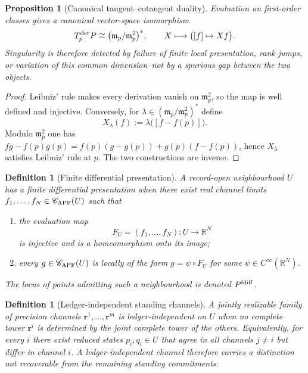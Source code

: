 \documentclass[11pt]{article}
\newtheorem{proposition}[theorem]{Proposition}
\newtheorem{definition}[theorem]{Definition}
\theoremstyle{remark}
\begin{document}
\begin{proposition}[Canonical tangent--cotangent duality]
\label{prop:derivation-cotangent-pairing}
Evaluation on first-order classes gives a canonical vector-space isomorphism
\[
 T_p^{\rm der}P
 \cong
 \bigl(\mathfrak m_p/\mathfrak m_p^2\bigr)^*,
 \qquad
 X\longmapsto\bigl([f]\mapsto Xf\bigr).
\]
Singularity is therefore detected by failure of finite local presentation,
rank jumps, or variation of this common dimension--not by a spurious gap
between the two objects.
\end{proposition}

\begin{proof}
Leibniz' rule makes every derivation vanish on $\mathfrak m_p^2$, so the map is
well defined and injective.  Conversely, for
$\lambda\in(\mathfrak m_p/\mathfrak m_p^2)^*$ define
\[
X_\lambda(f):=\lambda\bigl([f-f(p)]\bigr).
\]
Modulo $\mathfrak m_p^2$ one has
$fg-f(p)g(p)=f(p)(g-g(p))+g(p)(f-f(p))$, hence $X_\lambda$ satisfies Leibniz'
rule at $p$.  The two constructions are inverse.
\end{proof}

\begin{definition}[Finite differential presentation]
\label{def:locally-finitely-generated}
A record-open neighbourhood $U$ has a \emph{finite differential presentation}
when there exist real channel limits $f_1,\ldots,f_N\in\mathscr C_{\rm APF}(U)$ such that
\begin{enumerate}[label=(\roman*)]
\item the evaluation map
\[
F_U=(f_1,\ldots,f_N):U\to\mathbb R^N
\]
is injective and is a homeomorphism onto its image;
\item every $g\in\mathscr C_{\rm APF}(U)$ is locally of the form
$g=\psi\circ F_U$ for some $\psi\in C^\infty(\mathbb R^N)$.
\end{enumerate}
The locus of points admitting such a neighbourhood is denoted
$P^{\rm fdiff}$.
\end{definition}

\begin{definition}[Ledger-independent standing channels]
\label{def:independent-standing-channel}
A jointly realizable family of precision channels
$\mathbf r^1,\ldots,\mathbf r^m$ is \emph{ledger-independent} on $U$ when no
complete tower $\mathbf r^i$ is determined by the joint complete tower of the
others.  Equivalently, for every $i$ there exist reduced states $p_i,q_i\in U$
that agree in all channels $j\neq i$ but differ in channel $i$.  A
ledger-independent channel therefore carries a distinction not recoverable
from the remaining standing commitments.
\end{definition}
\end{document}

